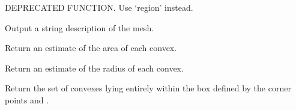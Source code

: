 \documentclass[a4paper,11pt,english]{sphinxmanual}
\begin{document}
\begin{fulllineitems}
\begin{fulllineitems}
\end{fulllineitems}


\begin{fulllineitems}
\label{\detokenize{python/cmdref_Mesh:getfem.Mesh.boundary}}
DEPRECATED FUNCTION. Use ‘region’ instead.

\end{fulllineitems}


\begin{fulllineitems}
\label{\detokenize{python/cmdref_Mesh:getfem.Mesh.char}}
Output a string description of the mesh.

\end{fulllineitems}


\begin{fulllineitems}
\label{\detokenize{python/cmdref_Mesh:getfem.Mesh.convex_area}}
Return an estimate of the area of each convex.

\end{fulllineitems}


\begin{fulllineitems}
\label{\detokenize{python/cmdref_Mesh:getfem.Mesh.convex_radius}}
Return an estimate of the radius of each convex.

\end{fulllineitems}


\begin{fulllineitems}
\label{\detokenize{python/cmdref_Mesh:getfem.Mesh.convexes_in_box}}
Return the set of convexes lying entirely within the box defined by the corner points  and .


\end{fulllineitems}
\end{fulllineitems}
\end{document}
